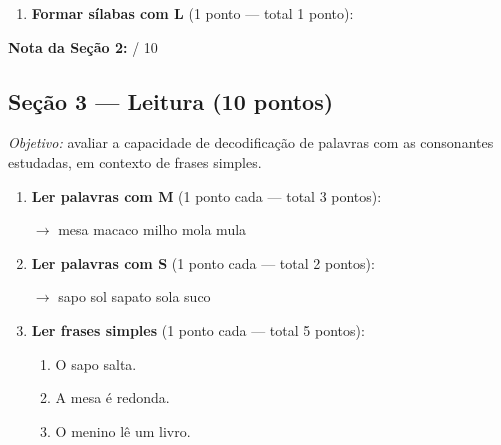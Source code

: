 \begin{avaliacao}
\begin{enumerate}[resume]
  \begin{center}
   \quad {} \quad {} \quad {} \quad {}
  \end{center}

  \item \textbf{Formar sílabas com L} (1 ponto — total 1 ponto):

  \begin{center}
   \quad {} \quad {} \quad {} \quad {}
  \end{center}
\end{enumerate}

\medskip
\noindent\textbf{Nota da Seção 2:} \underline{\hspace{1cm}} / 10

\subsection*{Seção 3 — Leitura (10 pontos)}

\textit{Objetivo:} avaliar a capacidade de decodificação de palavras
com as consonantes estudadas, em contexto de frases simples.

\begin{enumerate}[resume]
  \item \textbf{Ler palavras com M} (1 ponto cada — total 3 pontos):

  \begin{center}
  $\rightarrow$ mesa \quad macaco \quad milho \quad mola \quad mula
  \end{center}

  \item \textbf{Ler palavras com S} (1 ponto cada — total 2 pontos):

  \begin{center}
  $\rightarrow$ sapo \quad sol \quad sapato \quad sola \quad suco
  \end{center}

  \item \textbf{Ler frases simples} (1 ponto cada — total 5 pontos):

  \begin{enumerate}[label=\arabic*., leftmargin=1.5cm]
    \item O sapo salta.
    \item A mesa é redonda.
    \item O menino lê um livro.
  \end{enumerate}
\end{enumerate}


\end{avaliacao}
